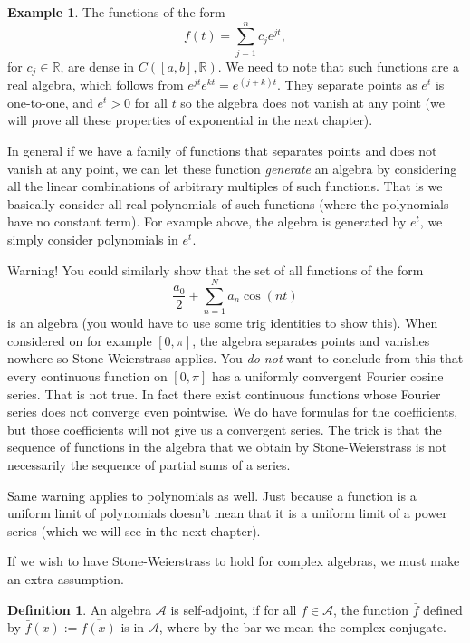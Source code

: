 \documentclass[12pt]{book}
\newcommand{\R}{{\mathbb{R}}}
\newcommand{\sA}{{\mathcal{A}}}
\theoremstyle{plain}
\theoremstyle{remark}
\theoremstyle{definition}
\newtheorem{defn}[thm]{Definition}
\theoremstyle{exercise}
\theoremstyle{example}
\newtheorem{example}[thm]{Example}
\begin{document}

\begin{example}
The functions of the form
\begin{equation*}
f(t) = \sum_{j=1}^n c_j e^{jt},
\end{equation*}
for $c_j \in \R$,
are dense in $C([a,b],\R)$.  We need to note that such functions are a real
algebra, which follows from $e^{jt} e^{kt} = e^{(j+k)t}$.  They separate
points as $e^t$ is one-to-one, and $e^t > 0$ for all $t$ so the algebra
does not vanish at any point (we will prove all these properties of exponential
in the next chapter). 
\end{example}

In general if we have a family of functions that separates points and does
not vanish at any point, we can let these function \emph{generate} an algebra
by considering all the linear combinations of arbitrary multiples of such
functions.  That is we basically consider all real polynomials of such
functions (where the polynomials have no constant term).  For example above,
the algebra is generated by $e^t$, we simply
consider polynomials in $e^t$.

Warning!
You could similarly show that the set of all functions of the form
$$
\frac{a_0}{2} +
\sum_{n=1}^N a_n \cos(nt)
$$
is an algebra (you would have to use some trig identities to show this).
When considered on for example $[0,\pi]$, the
algebra separates points and vanishes nowhere so Stone-Weierstrass applies.
You \emph{do not} want to conclude from this that every continuous
function on $[0,\pi]$ has a uniformly convergent
Fourier cosine series.  That is not true.
In fact there exist continuous functions
whose Fourier series does not converge even pointwise.  We do have formulas
for the coefficients, but those coefficients will not give us a convergent
series.  The
trick is that the sequence of functions in the algebra that we obtain
by Stone-Weierstrass
is not necessarily the sequence of partial sums of a series.

Same warning applies to polynomials as well.  Just because a function is a
uniform limit of polynomials doesn't mean that it is a uniform limit of a
power series (which we will see in the next chapter).  

If we wish to have Stone-Weierstrass to hold for complex algebras, we must
make an extra assumption.

\begin{defn}
An algebra $\sA$ is self-adjoint, if for all $f \in \sA$, the function
$\bar{f}$ defined by $\bar{f}(x) := \overline{f(x)}$ is in $\sA$, where by the
bar we mean the complex conjugate.
\end{defn}
\end{document}
